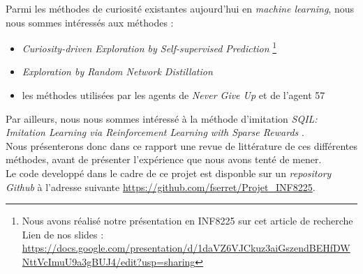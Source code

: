 \documentclass[a4paper,12pt]{report}
\begin{document}
Parmi les méthodes de curiosité existantes aujourd'hui en \textit{machine learning}, nous nous sommes intéressés aux méthodes :
\begin{itemize}
    \item \textit{Curiosity-driven Exploration by Self-supervised Prediction} \cite{curiosity} \footnote{Nous avons réalisé notre présentation en INF8225 sur cet article de recherche\\ \indent \indent Lien de nos slides : \\ \indent \indent \url{https://docs.google.com/presentation/d/1daVZ6VJCkuz3aiGszendBEHfDWNttVcImuU9a3gBUJ4/edit?usp=sharing}}
    \item \textit{Exploration by Random Network Distillation} \cite{distillation}
    \item les méthodes utilisées par les agents de \textit{Never Give Up} \cite{ngu} et de l'agent 57 \cite{agent57}
\end{itemize}
Par ailleurs, nous nous sommes intéressé à la méthode d'imitation \textit{SQIL: Imitation Learning via Reinforcement Learning with Sparse Rewards} \cite{sqil}.\\

Nous présenterons donc dans ce rapport une revue de littérature de ces différentes méthodes, avant de présenter l'expérience que nous avons tenté de mener.\\

Le code developpé dans le cadre de ce projet est disponble sur un \textit{repository Github} à l'adresse suivante \url{https://github.com/fserret/Projet_INF8225}.
\end{document}

